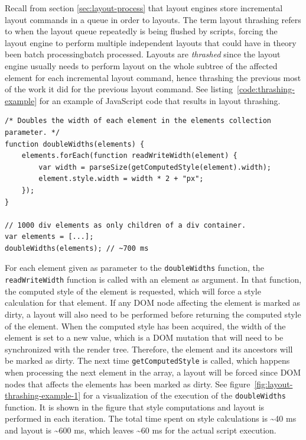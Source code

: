 \documentclass[a4paper,11pt]{kth-mag}
\newcommand{\code}[1]{\texttt{#1}}
\begin{document}
        Recall from section \ref{sec:layout-process} that \glspl{layout engine} store incremental layout commands in a queue in order to  layouts.
        The term \gls{layout thrashing} refers to when the layout queue repeatedly is being flushed by scripts, forcing the \gls{layout engine} to perform multiple independent layouts that could have in theory been \gls{batch processing}{batch processed}.
        Layouts are \emph{thrashed} since the layout engine usually needs to perform layout on the whole subtree of the affected element for each incremental layout command, hence thrashing the previous most of the work it did for the previous layout command.
        See listing~\ref{code:thrashing-example} for an example of \gls{JavaScript} code that results in layout thrashing.
        \begin{lstlisting}[caption={Example of layout thrashing. The code reads and double the widths of 1000 \glspl{element} in \textasciitilde700 ms. The \code{parseSize} function is not important to understand the example.}, captionpos=b, label={code:thrashing-example}]
/* Doubles the width of each element in the elements collection parameter. */
function doubleWidths(elements) {
    elements.forEach(function readWriteWidth(element) {
        var width = parseSize(getComputedStyle(element).width);
        element.style.width = width * 2 + "px";
    });
}

// 1000 div elements as only children of a div container.
var elements = [...];
doubleWidths(elements); // ~700 ms
        \end{lstlisting}
        For each element given as parameter to the \code{doubleWidths} function, the \code{readWriteWidth} function is called with an element as argument.
        In that function, the computed style of the element is requested, which will force a style calculation for that element.
        If any \gls{DOM} node affecting the element is marked as dirty, a layout will also need to be performed before returning the computed style of the element.
        When the computed style has been acquired, the width of the element is set to a new value, which is a \gls{DOM} mutation that will need to be synchronized with the render tree.
        Therefore, the element and its ancestors will be marked as dirty.
        The next time \code{getComputedStyle} is called, which happens when processing the next element in the array, a layout will be forced since \gls{DOM} nodes that affects the elements has been marked as dirty.
        See figure~\ref{fig:layout-thrashing-example-1} for a visualization of the execution of the \code{doubleWidths} function.
        It is shown in the figure that style computations and layout is performed in each iteration.
        The total time spent on style calculations is \textasciitilde40 ms and layout is \textasciitilde600 ms, which leaves \textasciitilde60 ms for the actual script execution.
\end{document}
